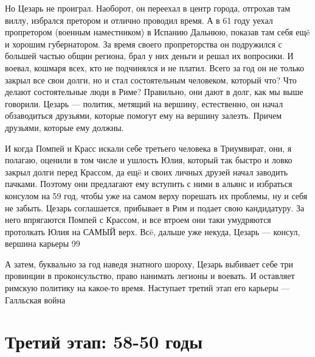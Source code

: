 Но Цезарь не проиграл. Наоборот, он переехал в центр города, отгрохав там виллу, избрался претором и отлично проводил время. А в 61 году уехал пропретором (военным наместником) в Испанию Дальнюю, показав там себя ещë и хорошим губернатором. За время своего пропреторства он подружился с большей частью общин региона, брал у них деньги и решал их вопросики. И воевал, кошмаря всех, кто не подчинялся и не платил. Всего за год он не только закрыл все свои долги, но и стал состоятельным человеком, который что? Что делают состоятельные люди в Риме? Правильно, они дают в долг, как мы выше говорили. Цезарь — политик, метящий на вершину, естественно, он начал обзаводиться друзьями, которые помогут ему на вершину залезть. Причем друзьями, которые ему должны.


И когда Помпей и Красс искали себе третьего человека в Триумвират, они, я полагаю, оценили в том числе и ушлость Юлия, который так быстро и ловко закрыл долги перед Крассом, да ещë и своих личных друзей начал заводить пачками. Поэтому они предлагают ему вступить с ними в альянс и избраться консулом на 59 год, чтобы уже на самом верху порешать их проблемы, ну и себя не забыть. Цезарь соглашается, прибывает в Рим и подает свою кандидатуру. За него впрягаются Помпей с Крассом, и все втроем они таки умудряются протолкать Юлия на САМЫЙ верх. Всë, дальше уже некуда, Цезарь — консул, вершина карьеры 99%


А затем, буквально за год наведя знатного шороху, Цезарь выбивает себе три провинции в проконсульство, право нанимать легионы и воевать. И оставляет римскую политику на какое-то время. Наступает третий этап его карьеры — Галльская война 

\section{Третий этап: 58-50 годы}

